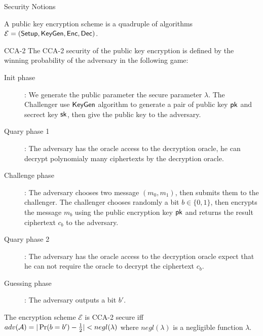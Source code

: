 \begin{subsection}{Security Notions}

  
  A public key encryption scheme is a quadruple of algorithms $\mathcal{E} = ({\mathsf{Setup}}, {\mathsf{KeyGen}}, {\mathsf{Enc}}, {\mathsf{Dec}})$.

  \begin{myDef}{CCA-2}
  The CCA-2 security of the public key encryption is defined by the winning probability of the adversary in the following game:
  \begin{description}
  \item[Init phase]:
    We generate the public parameter \wrt the secure parameter $\lambda$. The Challenger use ${\mathsf{KeyGen}}$ algorithm to generate a pair of public key $\mathsf{pk}$ and secrect key $\mathsf{sk}$, then give the public key to the adversary.
  \item[Quary phase 1]: The adversary has the oracle access to the decryption oracle, he can decrypt polynomialy many ciphertexts by the decryption oracle.
  \item[Challenge phase]: The adversary chooses two message $(m_0, m_1)$, then submits them to the challenger. The challenger chooses randomly a bit $b \in \{0,1\}$, then encrypts the message $m_b$ using the public encryption key $\mathsf{pk}$ and returns the result ciphertext $c_b$ to the adversary.
  \item[Quary phase 2]: The adversary has the oracle access to the decryption oracle expect that he can not require the oracle to decrypt the ciphertext $c_b$.
  \item[Guessing phase]: The adversary outputs a bit $b'$.
  \end{description}

  The encryption scheme $\mathcal{E}$ is CCA-2 secure iff $adv(\mathcal{A}) = |\operatorname{Pr}(b = b') - \frac{1}{2}| < negl(\lambda)$ where $negl(\lambda)$ is a negligible function \wrt $\lambda$.
  \end{myDef}


\end{subsection}
